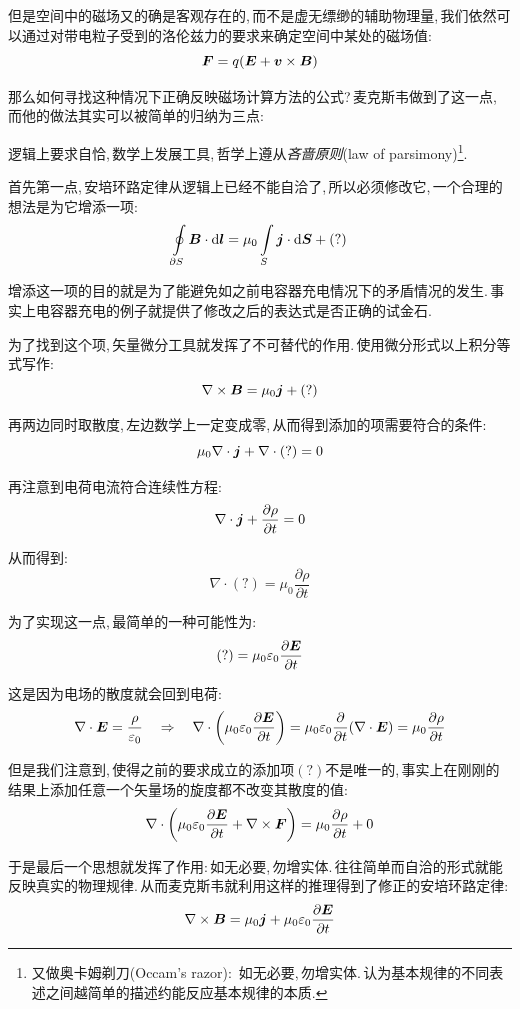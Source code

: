 但是空间中的磁场又的确是客观存在的,\,而不是虚无缥缈的辅助物理量,\,我们依然可以通过对带电粒子受到的洛伦兹力的要求来确定空间中某处的磁场值:
\[\boldsymbol{F}=q(\boldsymbol{E}+\boldsymbol{v}\times\boldsymbol{B})\]

那么如何寻找这种情况下正确反映磁场计算方法的公式?\,麦克斯韦做到了这一点,\,而他的做法其实可以被简单的归纳为三点:

逻辑上要求自恰,\,数学上发展工具,\,哲学上遵从\emph{吝啬原则}(law of parsimony)\footnote{又做奥卡姆剃刀(Occam's razor):\, 如无必要,\,勿增实体.\,认为基本规律的不同表述之间越简单的描述约能反应基本规律的本质.}.

首先第一点,\,安培环路定律从逻辑上已经不能自洽了,\,所以必须修改它,\,一个合理的想法是为它增添一项:
\[\oint\limits_{\partial S} \boldsymbol{B}\cdot \textrm{d} \boldsymbol{l}=\mu_0\int\limits_{S}\boldsymbol{j}\cdot \textrm{d} \boldsymbol{S}+(?)\]

增添这一项的目的就是为了能避免如之前电容器充电情况下的矛盾情况的发生.\,事实上电容器充电的例子就提供了修改之后的表达式是否正确的试金石.

为了找到这个项,\,矢量微分工具就发挥了不可替代的作用.\,使用微分形式以上积分等式写作:
\[\nabla\times\boldsymbol{B}=\mu_0\boldsymbol{j}+(?)\]

再两边同时取散度,\,左边数学上一定变成零,\,从而得到添加的项需要符合的条件:
\[\mu_0\nabla\cdot \boldsymbol{j}+\nabla\cdot(?)=0\]

再注意到电荷电流符合连续性方程:
\[\nabla\cdot \boldsymbol{j}+\frac{\partial \rho}{\partial t}=0\]

从而得到:
\[\nabla \cdot (?)=\mu_0\frac{\partial \rho}{\partial t} \]

为了实现这一点,\,最简单的一种可能性为:
\[(?)=\mu_0\varepsilon_0\frac{\partial \boldsymbol{E}}{\partial t}\]

这是因为电场的散度就会回到电荷:
\[\nabla\cdot\boldsymbol{E}=\frac{\rho}{\varepsilon_0} \quad \Rightarrow \quad \nabla \cdot \left(\mu_0\varepsilon_0\frac{\partial \boldsymbol{E}}{\partial t}\right)=\mu_0\varepsilon_0\frac{\partial }{\partial t}(\nabla\cdot\boldsymbol{E})=\mu_0\frac{\partial \rho}{\partial t}\]

但是我们注意到,\,使得之前的要求成立的添加项$(?)$不是唯一的,\,事实上在刚刚的结果上添加任意一个矢量场的旋度都不改变其散度的值:
\[\nabla\cdot\left(\mu_0\varepsilon_0\frac{\partial \boldsymbol{E}}{\partial t}+\nabla\times \boldsymbol{F}\right)=\mu_0\frac{\partial \rho}{\partial t}+0\]

于是最后一个思想就发挥了作用:\,如无必要,\,勿增实体.\,往往简单而自洽的形式就能反映真实的物理规律.\,从而麦克斯韦就利用这样的推理得到了修正的安培环路定律:
\[\nabla\times\boldsymbol{B}=\mu_0\boldsymbol{j}+\mu_0\varepsilon_0\frac{\partial \boldsymbol{E}}{\partial t}\]

